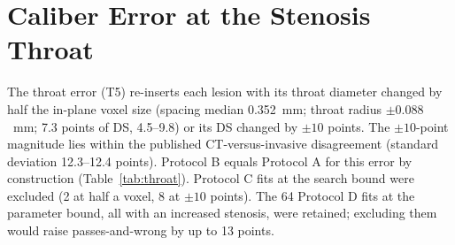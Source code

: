 \documentclass[journal,twoside,web,onecolumn]{ieeecolor}
\begin{document}
\FloatBarrier
{}
\section{Caliber Error at the Stenosis Throat}\label{sec:throat}
The throat error (T5) re-inserts each lesion with its throat diameter changed by half the in-plane voxel size
(spacing median 0.352~mm; throat radius $\pm 0.088$~mm; 7.3 points of DS, 4.5--9.8) or its DS changed by $\pm 10$ points. The $\pm 10$-point magnitude lies within the published CT-versus-invasive disagreement (standard deviation 12.3--12.4 points). Protocol B equals
Protocol A for this error by construction (Table~\ref{tab:throat}). Protocol C fits at the search bound were excluded
(2 at half a voxel, 8 at $\pm 10$ points). The 64 Protocol D fits at the parameter bound, all with an increased
stenosis, were retained; excluding them would raise passes-and-wrong by up to 13 points.
\end{document}
